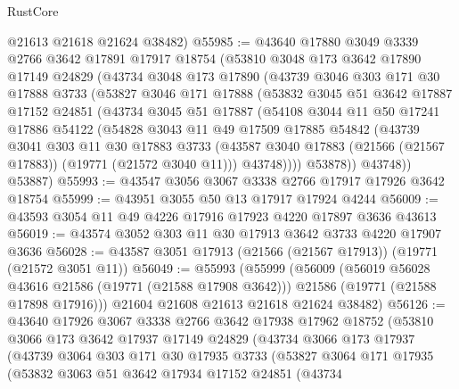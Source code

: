 \begin{lexlean}{RustCore}
\begin{coremodule}
      @21613
      @21618
      @21624
      @38482)
@55985 := @43640
    @17880
    @3049
    @3339
    @2766
    @3642
    @17891
    @17917
    @18754
    (@53810
      @3048
      @173
      @3642
      @17890
      @17149
      @24829
      (@43734
        @3048
        @173
        @17890
        (@43739
          @3046
          @303
          @171
          @30
          @17888
          @3733
          (@53827
            @3046
            @171
            @17888
            (@53832
              @3045
              @51
              @3642
              @17887
              @17152
              @24851
              (@43734
                @3045
                @51
                @17887
                (@54108
                  @3044
                  @11
                  @50
                  @17241
                  @17886
                  @54122
                  (@54828
                    @3043
                    @11
                    @49
                    @17509
                    @17885
                    @54842
                    (@43739
                      @3041
                      @303
                      @11
                      @30
                      @17883
                      @3733
                      (@43587 @3040 @17883 (@21566 (@21567 @17883)) (@19771 (@21572 @3040 @11)))
                      @43748))))
              @53878))
          @43748))
      @53887)
@55993 := @43547 @3056 @3067 @3338 @2766 @17917 @17926 @3642 @18754
@55999 := @43951 @3055 @50 @13 @17917 @17924 @4244
@56009 := @43593 @3054 @11 @49 @4226 @17916 @17923 @4220 @17897 @3636 @43613
@56019 := @43574 @3052 @303 @11 @30 @17913 @3642 @3733 @4220 @17907 @3636
@56028 := @43587 @3051 @17913 (@21566 (@21567 @17913)) (@19771 (@21572 @3051 @11))
@56049 := @55993
    (@55999
      (@56009
        (@56019 @56028 @43616 @21586 (@19771 (@21588 @17908 @3642)))
        @21586
        (@19771 (@21588 @17898 @17916)))
      @21604
      @21608
      @21613
      @21618
      @21624
      @38482)
@56126 := @43640
    @17926
    @3067
    @3338
    @2766
    @3642
    @17938
    @17962
    @18752
    (@53810
      @3066
      @173
      @3642
      @17937
      @17149
      @24829
      (@43734
        @3066
        @173
        @17937
        (@43739
          @3064
          @303
          @171
          @30
          @17935
          @3733
          (@53827
            @3064
            @171
            @17935
            (@53832
              @3063
              @51
              @3642
              @17934
              @17152
              @24851
              (@43734

\end{coremodule}
\end{lexlean}
